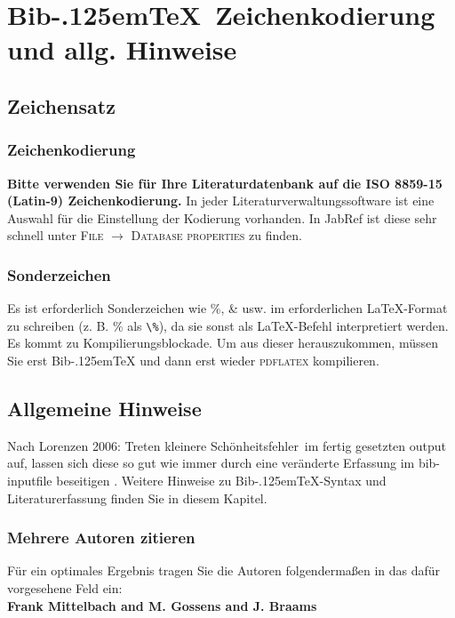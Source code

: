\documentclass[xlevel, hyperref, nat, mp]{wise}
\newcommand{\bibtex}{\texorpdfstring{Bib\kern-.125em\TeX}{BibTeX}}
\newcommand\code[1]{\texttt{#1}}
\newcommand\command[1]{\code{\textbackslash{}#1}}
\newcommand{\gr}{\grqq \ }
\begin{document}
\section{\bibtex \ Zeichenkodierung und allg. Hinweise }
\label{sec:hints}
\subsection{Zeichensatz}
\subsubsection{Zeichenkodierung}
\textbf{Bitte verwenden Sie für Ihre Literaturdatenbank auf die ISO 8859-15 (Latin-9) Zeichenkodierung. } In jeder Literaturverwaltungssoftware ist eine Auswahl für die Einstellung der Kodierung vorhanden. In JabRef ist diese sehr schnell unter \textsc{File $\rightarrow$ Database properties} zu finden. 
\subsubsection{Sonderzeichen}
Es ist erforderlich Sonderzeichen wie \%, \& usw. im erforderlichen \LaTeX -Format zu schreiben (z. B. \% als \command{\%}), da sie sonst als \LaTeX -Befehl interpretiert werden. Es kommt zu Kompilierungsblockade. Um aus dieser herauszukommen, müssen Sie erst \bibtex{} und dann erst wieder \textsc{pdflatex} kompilieren. 


\newpage
\subsection{Allgemeine Hinweise}

Nach Lorenzen 2006: Treten kleinere \glqq Schönheitsfehler\gr im fertig gesetzten output auf, lassen sich diese so gut wie immer durch eine veränderte
Erfassung im bib-inputfile beseitigen \cite{alphadin}. Weitere Hinweise zu \bibtex -Syntax und Literaturerfassung finden Sie in diesem Kapitel. 

\subsubsection{Mehrere Autoren zitieren}
\label{sec:mehrereAutoren}

Für ein optimales Ergebnis tragen Sie die Autoren folgendermaßen in das dafür vorgesehene Feld ein:\\

\textbf{Frank Mittelbach and M. Gossens and J. Braams}\\
\end{document}
